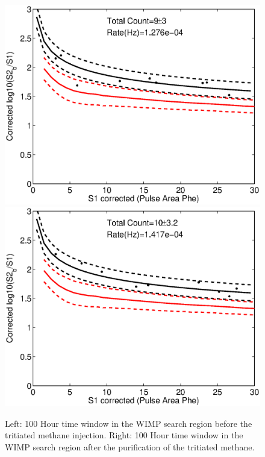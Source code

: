 \begin{figure}[H]\centering
\includegraphics[scale=0.25]{CH3T_fid_30_before_100_18_lux10_20130813T1120_cp05328_note.eps}
\includegraphics[scale=0.25]{CH3T_fid_30_after_100_18_afterlux10_20130813T1120_cp05328_note.eps}
\caption{Left: 100 Hour time window in the WIMP search region before the tritiated methane injection. Right: 100 Hour time window in the WIMP search region after the purification of the tritiated methane. }
\label{fig:Removal_2}
\end{figure}

